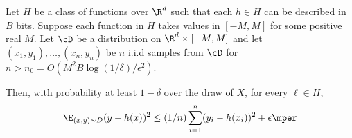 \begin{fact} \label{fact:standard-generalization-bound}
Let $H$ be a class of functions over $\R^d$ such that each $h \in H$ can be described in $B$ bits. Suppose each function in $H$ takes values in $[-M,M]$ for some positive real $M$.  
Let $\cD$ be a distribution on $\R^d \times [-M,M]$ and let $(x_1,y_1),\ldots,(x_n,y_n)$ be $n$ i.i.d samples from $\cD$ for $n > n_0 = O(M^2 B\log{(1/\delta)}/\epsilon^2)$. 

Then, with probability at least $1-\delta$ over the draw of $X$, for every $\ell \in H$, 
\[
\E_{(x,y) \sim D} (y - h(x))^2 \leq (1/n) \sum_{i=1}^n (y_i - h(x_i))^2 + \epsilon \mper
\]

\end{fact}

